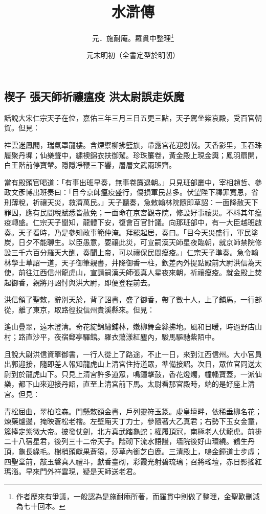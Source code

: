 \documentclass[11pt,a4paper]{article}
\title{\iyan 水滸傳}
\author{元．施耐庵。羅貫中整理\thanks{作者歷來有爭議，一般認為是施耐庵所著，而羅貫中則做了整理，金聖歎刪減為七十回本。}}
\date{元末明初（全書定型於明朝）}
\begin{document}
\maketitle

\subsection{楔子 張天師祈禳瘟疫 洪太尉誤走妖魔}

話說大宋仁宗天子在位，嘉佑三年三月三日五更三點，天子駕坐紫哀殿，受百官朝賀。但見：

祥雲迷鳳閣，瑞氣罩龍樓。含煙禦柳拂籃旗，帶露宮花迎劍戟。天香影里，玉吞珠履聚丹墀；仙樂聲中，繡襖錦衣扶御駕。珍珠簾卷，黃金殿上現金輿；鳳羽扇開，白王階前停寶輦。隱隱凈鞭三下響，層層文武兩班齊。

當有殿頭官喝道：「有事出班早奏，無事卷簾退朝。」只見班部叢中，宰相趙哲、參政文彥博出班奏曰：「目今京師瘟疫盛行，傷損軍民甚多。伏望陛下釋罪寬恩，省刑薄稅，祈禳天災，救濟萬民。」天子聽奏，急敕翰林院隨即草詔：一面降赦天下罪囚，應有民間稅賦悉皆赦免；一面命在京宮觀寺院，修設好事禳災。不料其年瘟疫轉盛。仁宗天子聞知，龍體下安，復會百官計議。向那班部中，有一大臣越班啟奏。天子看時，乃是參知政事範仲淹。拜罷起居，奏曰。「目今天災盛行，軍民塗炭，日夕不能聊生。以臣愚意，要禳此災，可宣嗣漢天師星夜臨朝，就京師禁院修設三千六百分羅天大醮，奏聞上帝，可以禳保民間瘟疫。」仁宗天子準奏。急令翰林學士草詔一道，天子御筆親書，井降御香一柱，欽差內外提點殿前大尉洪信為天使，前往江西信州龍虎山，宣請嗣漢夭師張真人星夜來朝，祈禳瘟疫。就金殿上焚起御香，親將丹詔忖與洪大尉，即便登程前去。

洪信領了聖敕，辭別天於，背了詔書，盛了御香，帶了數十人，上了鋪馬，一行部從，離了東京，取路徑投信州貴溪縣來。但見：

遙山疊翠，遠木澄清。奇花綻錦繡鋪林，嫩柳舞金絲拂地。風和日暖，時過野店山村；路直沙平，夜宿郵亭驛館。羅衣蕩漾紅塵內，駿馬驅馳紫陌中。

且說大尉洪信資擎御書，一行人從上了路途，不止一日，來到江西信州。大小官員出郭迎接，隨即差人報知龍虎山上清宮住持道眾，準備接詔。次日，眾位官同送太尉到於龍虎山下。只見上清宮許多道眾，鳴鐘擊鼓，香花燈燭，幢幡寶蓋，一派仙樂，都下山來迎接丹詔，直至上清宮前下馬。太尉看那官殿時，端的是好座上清宮。但見：

青松屈曲，翠柏陰森。門懸敕額金書，戶列靈符玉篆。虛皇壇畔，依稀垂柳名花；煉藥爐邊，掩映蒼松老檜。左壁廂天丁力士，參隨著大乙真君；右勢下玉女金童，簇捧定紫微大帝。披發仗劍，北方真武踏龜蛇；權履頂冠，南極老人伏龍虎。前排二十八宿星君，後列三十二帝天子。階砌下流水語謾，墻院後好山環繞。鶴生丹頂，龜長綠毛。樹梢頭獻果蒼猿，莎草內銜芝白鹿。三清殿上，嗚金鐘道士步虛；四聖堂前，敲玉磐真人禮斗，獻香臺砌，彩霞光射碧琉璃；召將瑤壇，赤日影搖紅瑪淄。早來門外祥雲現，疑是天師送老君。
\end{document}

